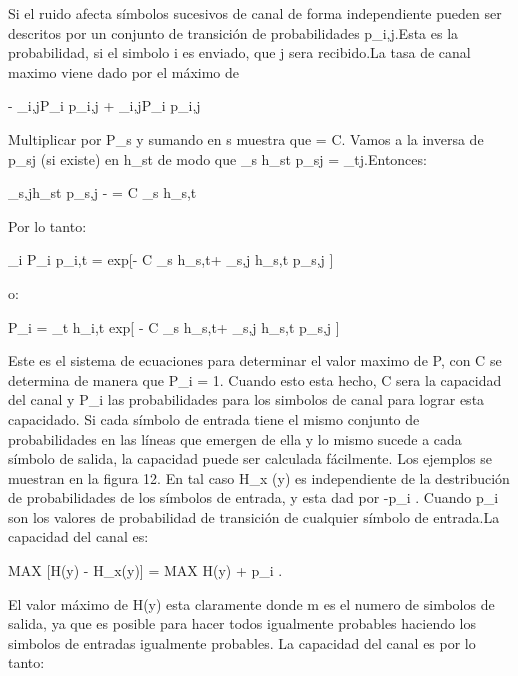Si el ruido afecta símbolos sucesivos de canal de forma independiente pueden ser descritos por un conjunto de transici\'on 
de probabilidades p_{i,j}.Esta es la probabilidad, si el simbolo i es enviado, que j sera recibido.La tasa de canal maximo 
viene dado por el m\'aximo de

\begin{center}
- \sum_{i,j}P_i p_{i,j}  + \sum_{i,j}P_i p_{i,j}
\end{center}
 
Multiplicar por P_s y sumando en s muestra que \mu = C. Vamos a la inversa de p_{sj} (si existe) en h_{st}  de modo que 
\sum_{s} h_{st} p_{sj} = \delta_{tj}.Entonces: 

\begin{center}
\sum_{s,j}h_{st} p_{s,j}  -  = C \sum_{s} h_{s,t}
\end{center}
Por lo tanto:

\begin{center}
\sum_{i} P_i p_{i,t} = exp[- C \sum_{s} h_{s,t}+ \sum_{s,j} h_{s,t} p_{s,j} ]
\end{center}

o:  
\begin{center}
P_i = \sum_{t} h_{i,t} exp[ - C \sum_{s} h_{s,t}+ \sum_{s,j} h_{s,t} p_{s,j}  ]
\end{center}


Este es el sistema de ecuaciones para determinar el valor maximo de P, con C se determina 
de manera que \sum P_i = 1. Cuando esto esta hecho, C sera la capacidad del canal y P_i las probabilidades 
para los simbolos de canal para lograr esta capacidado.
Si cada s\'imbolo de entrada tiene el mismo conjunto de probabilidades en las l\'ineas que emergen de ella 
y lo mismo sucede a cada s\'imbolo de salida, la capacidad puede ser calculada f\'acilmente. Los ejemplos se muestran en la figura 12. 
En tal caso H_x (y) es independiente de la destribuci\'on de probabilidades de los s\'imbolos de entrada, y esta dad por -\sum p_i . 
Cuando p_i son los valores de probabilidad de transici\'on de cualquier s\'imbolo de entrada.La capacidad del canal es:

\begin{center}
MAX [H(y) - H_x(y)] = MAX H(y) + \sum p_i .
\end{center}
  
El valor m\'aximo de H(y) esta claramente   donde m es el numero de simbolos de salida, ya que es posible para hacer 
todos igualmente probables haciendo los simbolos de entradas igualmente probables. La capacidad del canal es por lo tanto:

